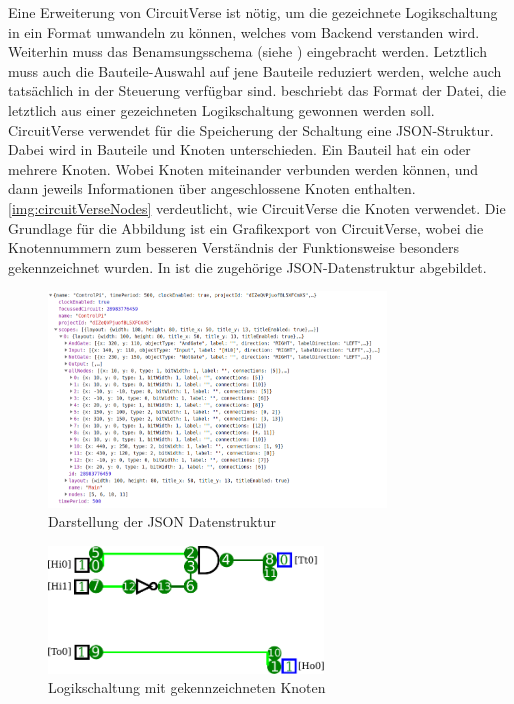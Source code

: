  Eine Erweiterung von CircuitVerse ist nötig, um die gezeichnete Logikschaltung in ein Format umwandeln zu können, welches vom Backend verstanden wird. Weiterhin muss das Benamsungsschema (siehe ) eingebracht werden. Letztlich muss auch die Bauteile-Auswahl auf jene Bauteile reduziert werden, welche auch tatsächlich in der Steuerung verfügbar sind.  beschriebt das Format der Datei, die letztlich aus einer gezeichneten Logikschaltung gewonnen werden soll. CircuitVerse verwendet für die Speicherung der Schaltung eine JSON-Struktur. Dabei wird in Bauteile und Knoten unterschieden. Ein Bauteil hat ein oder mehrere Knoten. Wobei Knoten miteinander verbunden werden können, und dann jeweils Informationen über angeschlossene Knoten enthalten. \autoref{img:circuitVerseNodes} verdeutlicht, wie CircuitVerse die Knoten verwendet. Die Grundlage für die Abbildung ist ein Grafikexport von CircuitVerse, wobei die Knotennummern zum besseren Verständnis der Funktionsweise besonders gekennzeichnet wurden. In ist die zugehörige JSON-Datenstruktur abgebildet.
 \begin{figure}[H]
 	\begin{center}
 		\includegraphics[width=0.8\textwidth ,clip]{./images/circuitverseLogicJson.png}
 		\caption{Darstellung der JSON Datenstruktur}
 		\label{img:circuitVerseJson}
 	\end{center} 
 \end{figure}	
 
 \begin{figure}[H]
 	\begin{center}
 		\includegraphics[width=0.65\textwidth ,clip]{./images/circuitverseLogicNodes.pdf}
 		\caption{Logikschaltung mit gekennzeichneten Knoten}
 		\label{img:circuitVerseNodes}
 	\end{center} 
 \end{figure}	
 
